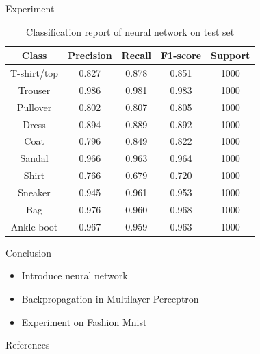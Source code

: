 \documentclass[10pt]{beamer}
\theoremstyle{remark}
\theoremstyle{definition}
\begin{document}
\begin{frame}[allowframebreaks]{Experiment}
	\begin{table} [h!]
		\centering
		\begin{tabular}{ || c | c | c | c | c|| }
		\hline
		Class & Precision & Recall & F1-score & Support \\ [0.5 ex]
		\hline \hline
		T-shirt/top & 0.827 & 0.878 & 0.851 & 1000 \\ \hline
		Trouser & 0.986 & 0.981 & 0.983 & 1000  \\ \hline
		Pullover & 0.802 & 0.807 & 0.805 & 1000 \\ \hline
		Dress & 0.894 & 0.889 & 0.892 & 1000 \\ \hline
		Coat & 0.796 & 0.849 & 0.822 & 1000 \\ \hline
		Sandal & 0.966 &0.963 & 0.964 & 1000\\ \hline
		Shirt & 0.766 & 0.679 & 0.720 & 1000\\ \hline 
		Sneaker & 0.945 & 0.961 & 0.953 & 1000 \\ \hline
		Bag &  0.976 & 0.960 & 0.968 & 1000 \\ \hline
		Ankle boot & 0.967 & 0.959 & 0.963 & 1000 \\ [1ex]
		\hline
		\end{tabular}
		\caption{Classification report of neural network on test set}
	\end{table}
\end{frame}

\begin{frame}[allowframebreaks]{Conclusion}
	\begin{itemize}
		\item Introduce neural network
  		\item Backpropagation in Multilayer Perceptron
    	\item Experiment on \href{https://github.com/zalandoresearch/fashion-mnist}{Fashion Mnist}
	\end{itemize}
\end{frame}

\begin{frame}[allowframebreaks]{References}
\printbibliography
\end{frame}
\end{document}
